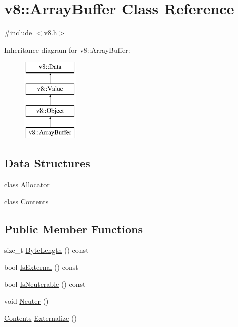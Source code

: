 \hypertarget{classv8_1_1ArrayBuffer}{}\section{v8\+:\+:Array\+Buffer Class Reference}
\label{classv8_1_1ArrayBuffer}


{\ttfamily \#include $<$v8.\+h$>$}

Inheritance diagram for v8\+:\+:Array\+Buffer\+:\begin{figure}[H]
\begin{center}
\leavevmode
\includegraphics[height=4.000000cm]{classv8_1_1ArrayBuffer}
\end{center}
\end{figure}
\subsection*{Data Structures}
\begin{DoxyCompactItemize}
\item 
class \hyperlink{classv8_1_1ArrayBuffer_1_1Allocator}{Allocator}
\item 
class \hyperlink{classv8_1_1ArrayBuffer_1_1Contents}{Contents}
\end{DoxyCompactItemize}
\subsection*{Public Member Functions}
\begin{DoxyCompactItemize}
\item 
size\+\_\+t \hyperlink{classv8_1_1ArrayBuffer_ab73b98ba6436b57c5a1b3d29429e0199}{Byte\+Length} () const 
\item 
bool \hyperlink{classv8_1_1ArrayBuffer_a50dd263917559439525048c623425c6f}{Is\+External} () const 
\item 
bool \hyperlink{classv8_1_1ArrayBuffer_aed177cd83c3368837f740fa2929b3c8d}{Is\+Neuterable} () const 
\item 
void \hyperlink{classv8_1_1ArrayBuffer_a3420f7d38a8fe20e8f40fb82e6acb325}{Neuter} ()
\item 
\hyperlink{classv8_1_1ArrayBuffer_1_1Contents}{Contents} \hyperlink{classv8_1_1ArrayBuffer_a8b90b72486cfacb4fbec157f4803f889}{Externalize} ()
\end{DoxyCompactItemize}
